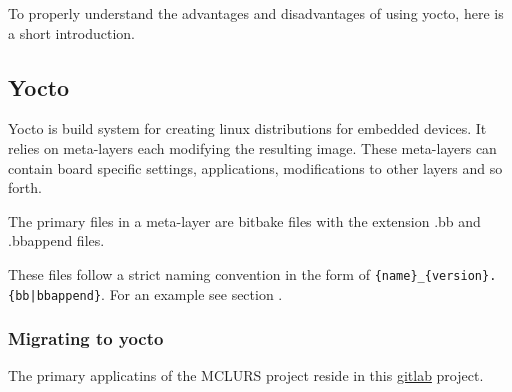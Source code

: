 \documentclass[../../main.tex]{subfiles}
\begin{document}
To properly understand the advantages and disadvantages of using yocto, here is a short introduction.

\subsection{Yocto}%
\label{sub:yocto}

Yocto is build system for creating linux distributions for embedded devices. It relies on meta-layers
each modifying the resulting image. These meta-layers can contain board specific settings,
applications, modifications to other layers and so forth.

The primary files in a meta-layer are bitbake files with the extension .bb and .bbappend files.

These files follow a strict naming convention in the form of
\texttt{\{name\}\_\{version\}.\{bb|bbappend\}}. For an example see section .



%
%
%
%
%

\subsubsection{Migrating to yocto}%
\label{ssub:migrating_to_yocto}

The primary applicatins of the MCLURS project reside in this
\href{https://gitlab.com/esrl/mclurs.git }{gitlab} project.
\end{document}
